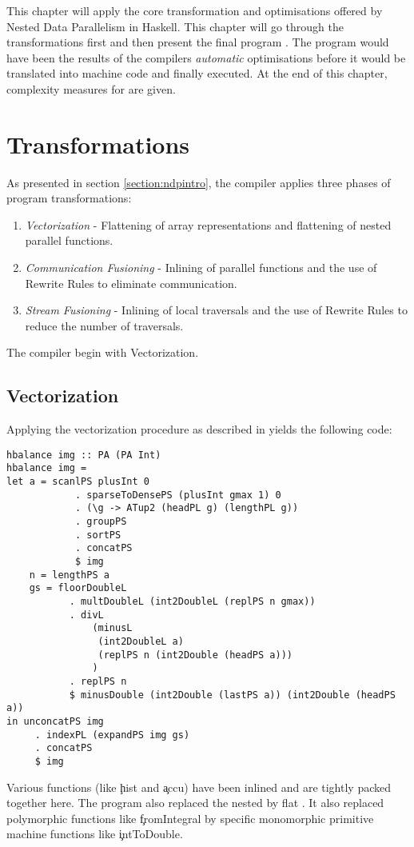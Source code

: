 \label{chapter:ndpv}

This chapter will apply the core transformation and optimisations
offered by Nested Data Parallelism in Haskell.
This chapter will go through the transformations first and then present the
final program \ndpv. The program would have been the results of the compilers \textit{automatic}
optimisations before it would be translated into machine code and finally executed.
At the end of this chapter, complexity measures for \ndpv are given.


\section{Transformations}
  As presented in section \ref{section:ndpintro}, the compiler applies
  three phases of program transformations:
  \begin{enumerate}
    \item \emph{Vectorization} - Flattening of array representations
      and flattening of nested parallel functions.
    \item \emph{Communication Fusioning} - Inlining of parallel
      functions and the use of Rewrite Rules
      to eliminate communication.
    \item \emph{Stream Fusioning} - Inlining of local traversals and
      the use of Rewrite Rules to reduce the number of traversals.
  \end{enumerate}
  
  The compiler begin with Vectorization.
  
  \subsection{Vectorization}
    Applying the vectorization procedure as described in \cite{Harness2008} yields the following code:
    \begin{lstlisting}
hbalance img :: PA (PA Int)
hbalance img = 
let a = scanlPS plusInt 0
            . sparseToDensePS (plusInt gmax 1) 0
            . (\g -> ATup2 (headPL g) (lengthPL g))
            . groupPS
            . sortPS
            . concatPS
            $ img
    n = lengthPS a
    gs = floorDoubleL
           . multDoubleL (int2DoubleL (replPS n gmax))
           . divL
               (minusL
                (int2DoubleL a)
                (replPS n (int2Double (headPS a)))
               )
           . replPS n
           $ minusDouble (int2Double (lastPS a)) (int2Double (headPS a))
in unconcatPS img
     . indexPL (expandPS img gs)
     . concatPS
     $ img
    \end{lstlisting} %
    Various functions (like \c{hist} and \c{accu}) have been inlined and are tightly packed together here.
    The program also replaced the nested \pan by flat \pav.
    It also replaced polymorphic functions like \c{fromIntegral}
    by specific monomorphic primitive machine functions like \c{intToDouble}.
    
